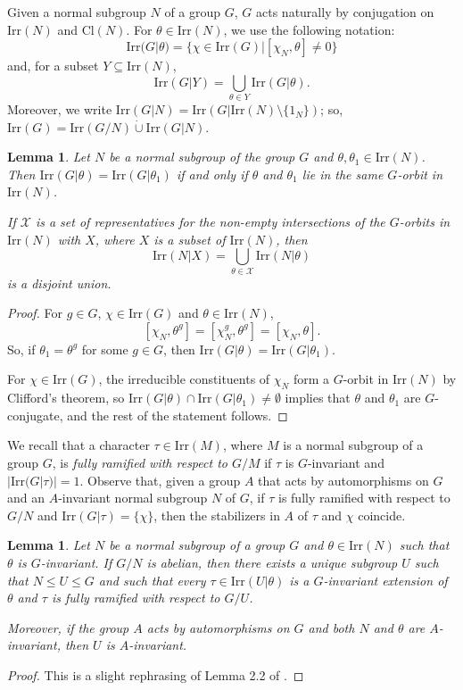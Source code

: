\documentclass{amsart}
\newtheorem{lemma}[theorem]{Lemma}
\def\irr#1{\mathrm{Irr}(#1)}
\def\cl#1{\mathrm{Cl}(#1)}
\begin{document}
Given a normal subgroup $N$  of a group $G$, $G$ acts naturally by conjugation on $\irr N$ and $\cl N$.
For $\theta \in \irr N$, we use the following notation:
$$\irr{G|\theta} = \{ \chi \in \irr G | [\chi_N, \theta] \neq 0 \}$$
and, for a subset $Y \subseteq \irr N$,
$$\irr{G|Y} = \bigcup_{ \theta \in Y} \irr{G|\theta}.$$
Moreover, we write $\irr{G|N} =  \irr{G|\irr N \setminus \{1_N\}}$;
so, $\irr G = \irr{G/N} \dot\cup \irr{G|N}$.
\begin{lemma}\label{lemma1}
  Let $N$ be a normal subgroup of the group $G$ and $\theta, \theta_1 \in \irr N$. Then
  $\irr{G|\theta} = \irr{G|\theta_1}$
  if and only if $\theta$ and $\theta_1$ lie in the same $G$-orbit in $\irr N$.


  If $\mathcal{X}$ is a set of representatives for the non-empty intersections of the $G$-orbits in $\irr N$ with $X$, where $X$ is a subset of $\irr N$, then
  $$\irr{N|X} = \bigcup_{\theta \in \mathcal{X}}\irr{N|\theta}$$
  is a disjoint union.
 
\end{lemma}
\begin{proof}
  For $g \in G$, $\chi \in \irr G$ and $\theta \in \irr N$,
  $$[\chi_N, \theta^g] = [\chi_N^g, \theta^g] = [\chi_{N}, \theta].$$
  So, if $\theta_1 = \theta^g$ for some $g\in G$, then $\irr{G|\theta} = \irr{G|\theta_1}$.

  For $\chi \in \irr G$, the irreducible constituents of $\chi_N$ form a $G$-orbit in $\irr N$ by Clifford's theorem, so
   $\irr{G|\theta} \cap \irr{G|\theta_1} \neq \emptyset$ implies that $\theta$ and $\theta_1$ are $G$-conjugate, and the rest of the statement follows.
\end{proof}


We recall that a character $\tau \in \irr M$, where $M$ is a normal subgroup of a group $G$, is \emph{fully ramified with respect to
  $G/M$} if $\tau$ is $G$-invariant and $|\irr{G| \tau}| = 1$.
Observe that, given a group $A$ that  acts by automorphisms on $G$ and an $A$-invariant normal subgroup $N$ of $G$, if $\tau$ is fully ramified with respect to $G/N$
and $\irr{G|\tau} = \{\chi \}$, then the stabilizers in $A$ of $\tau$ and $\chi$ coincide.

\begin{lemma}\label{lemma2}
  Let $N$ be a normal subgroup of a group $G$ and $\theta \in \irr N$ such that $\theta$ is $G$-invariant.
  If $G/N$ is abelian, then there exists a unique subgroup $U$ such that $N \leq U \leq G$ and such that
 every $\tau \in \irr{U| \theta}$ is a  $G$-invariant extension of $\theta$ and $\tau$ is fully ramified with respect to $G/U$.

 Moreover, if the group $A$ acts by automorphisms on $G$ and both   $N$ and $\theta$ are $A$-invariant, then $U$ is $A$-invariant.
\end{lemma}
\begin{proof}
  This is a slight rephrasing of Lemma 2.2 of \cite{W}.
\end{proof}
\end{document}
